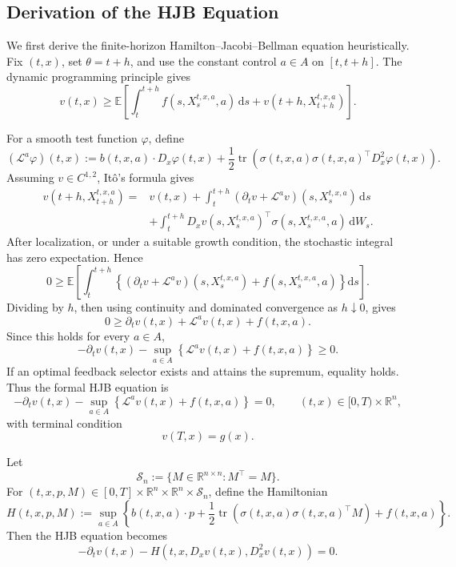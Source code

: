 \subsection{Derivation of the HJB Equation}

We first derive the finite-horizon Hamilton--Jacobi--Bellman equation heuristically. Fix \((t,x)\), set \(\theta=t+h\), and use the constant control \(a\in A\) on \([t,t+h]\). The dynamic programming principle gives
\[
v(t,x)
\ge
\mathbb E\!\left[
\int_t^{t+h}f(s,X_s^{t,x,a},a)\,\mathrm ds
+v(t+h,X_{t+h}^{t,x,a})
\right].
\]

For a smooth test function \(\varphi\), define
\[
(\mathcal L^a\varphi)(t,x)
:=b(t,x,a)\cdot D_x\varphi(t,x)
+\frac12\operatorname{tr}\!\left(
\sigma(t,x,a)\sigma(t,x,a)^\top
D_x^2\varphi(t,x)
\right).
\]
Assuming \(v\in C^{1,2}\), It\^o's formula gives
\[
\begin{aligned}
v(t+h,X_{t+h}^{t,x,a})
={}&v(t,x)
+\int_t^{t+h}
(\partial_t v+\mathcal L^av)(s,X_s^{t,x,a})\,\mathrm ds\\
&+\int_t^{t+h}
D_xv(s,X_s^{t,x,a})^\top
\sigma(s,X_s^{t,x,a},a)\,\mathrm dW_s.
\end{aligned}
\]
After localization, or under a suitable growth condition, the stochastic integral has zero expectation. Hence
\[
0\ge
\mathbb E\!\left[
\int_t^{t+h}
\left\{
(\partial_t v+\mathcal L^av)(s,X_s^{t,x,a})
+f(s,X_s^{t,x,a},a)
\right\}\mathrm ds
\right].
\]
Dividing by \(h\), then using continuity and dominated convergence as \(h\downarrow0\), gives
\[
0\ge
\partial_t v(t,x)
+\mathcal L^av(t,x)
+f(t,x,a).
\]
Since this holds for every \(a\in A\),
\[
-\partial_t v(t,x)
-\sup_{a\in A}
\left\{
\mathcal L^av(t,x)+f(t,x,a)
\right\}
\ge0.
\]
If an optimal feedback selector exists and attains the supremum, equality holds. Thus the formal HJB equation is
\[
-\partial_t v(t,x)
-\sup_{a\in A}
\left\{
\mathcal L^av(t,x)+f(t,x,a)
\right\}
=0,
\qquad (t,x)\in[0,T)\times\mathbb R^n,
\]
with terminal condition
\[
v(T,x)=g(x).
\]

Let
\[
\mathcal S_n
:=\{M\in\mathbb R^{n\times n}:M^\top=M\}.
\]
For \((t,x,p,M)\in[0,T]\times\mathbb R^n\times\mathbb R^n\times\mathcal S_n\), define the Hamiltonian
\[
H(t,x,p,M)
:=\sup_{a\in A}
\left\{
 b(t,x,a)\cdot p
 +\frac12\operatorname{tr}\!\left(
 \sigma(t,x,a)\sigma(t,x,a)^\top M
 \right)
 +f(t,x,a)
\right\}.
\]
Then the HJB equation becomes
\[
-\partial_t v(t,x)
-H(t,x,D_xv(t,x),D_x^2v(t,x))=0.
\]

